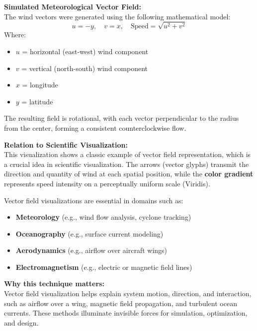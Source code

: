 \documentclass[11pt]{article}
\begin{document}
\vspace{1em}
\noindent
\textbf{Simulated Meteorological Vector Field:} \\
The wind vectors were generated using the following mathematical model:
\[
	u = -y, \quad v = x, \quad \text{Speed} = \sqrt{u^2 + v^2}
\]
Where:
\begin{itemize}
	\item $u$ = horizontal (east-west) wind component
	\item $v$ = vertical (north-south) wind component
	\item $x$ = longitude
	\item $y$ = latitude
\end{itemize}

The resulting field is rotational, with each vector perpendicular to the radius from the center, forming a consistent counterclockwise flow.

\vspace{1em}
\noindent
\textbf{Relation to Scientific Visualization:} \\
This visualization shows a classic example of vector field representation, which is a crucial idea in scientific visualization. The arrows (vector glyphs) transmit the direction and quantity of wind at each spatial position, while the \textbf{color gradient} represents speed intensity on a perceptually uniform scale (Viridis).
\vspace{1em}
    
Vector field visualizations are essential in domains such as:
\begin{itemize}
	\item \textbf{Meteorology} (e.g., wind flow analysis, cyclone tracking)
	\item \textbf{Oceanography} (e.g., surface current modeling)
	\item \textbf{Aerodynamics} (e.g., airflow over aircraft wings)
	\item \textbf{Electromagnetism} (e.g., electric or magnetic field lines)
\end{itemize}
	
\vspace{1em}
\noindent
\textbf{Why this technique matters:} \\
Vector field visualization helps explain system motion, direction, and interaction, such as airflow over a wing, magnetic field propagation, and turbulent ocean currents. These methods illuminate invisible forces for simulation, optimization, and design.
\end{document}
